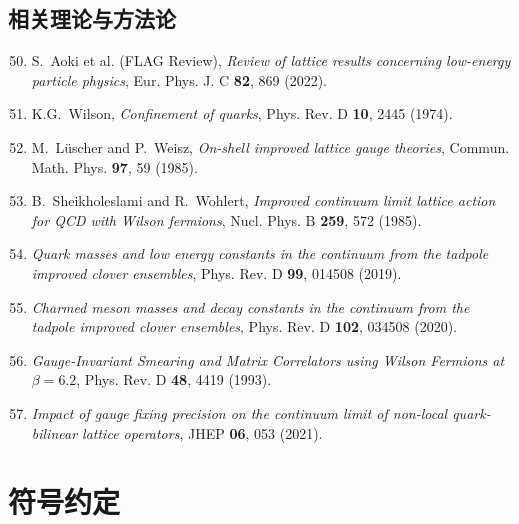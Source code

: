 \documentclass[11pt,a4paper]{ctexart}
\begin{document}
\subsection*{相关理论与方法论}
\begin{enumerate}\setcounter{enumi}{49}
  \item S.~Aoki et al. (FLAG Review), \textit{Review of lattice results concerning low-energy particle physics}, Eur. Phys. J. C \textbf{82}, 869 (2022).
  \item K.G.~Wilson, \textit{Confinement of quarks}, Phys. Rev. D \textbf{10}, 2445 (1974).
  \item M.~L\"uscher and P.~Weisz, \textit{On-shell improved lattice gauge theories}, Commun. Math. Phys. \textbf{97}, 59 (1985).
  \item B.~Sheikholeslami and R.~Wohlert, \textit{Improved continuum limit lattice action for QCD with Wilson fermions}, Nucl. Phys. B \textbf{259}, 572 (1985).
  \item \textit{Quark masses and low energy constants in the continuum from the tadpole improved clover ensembles}, Phys. Rev. D \textbf{99}, 014508 (2019).
  \item \textit{Charmed meson masses and decay constants in the continuum from the tadpole improved clover ensembles}, Phys. Rev. D \textbf{102}, 034508 (2020).
  \item \textit{Gauge-Invariant Smearing and Matrix Correlators using Wilson Fermions at $\beta=6.2$}, Phys. Rev. D \textbf{48}, 4419 (1993).
  \item \textit{Impact of gauge fixing precision on the continuum limit of non-local quark-bilinear lattice operators}, JHEP \textbf{06}, 053 (2021).
\end{enumerate}

\appendix
\section{符号约定}
\end{document}
